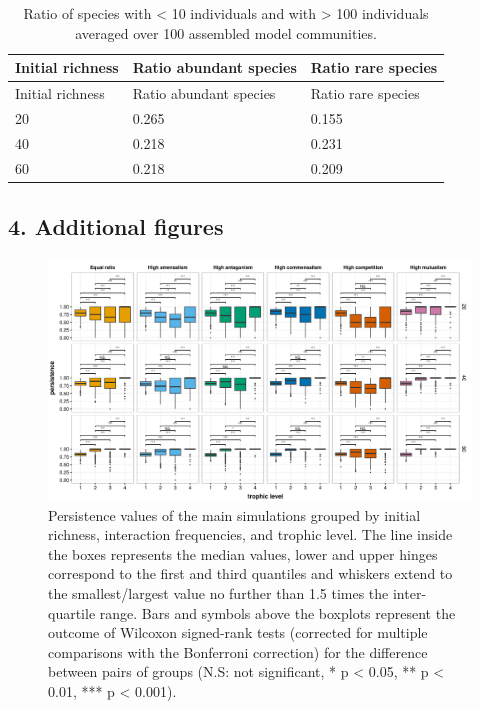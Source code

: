 \begin{longtable}[]{@{}lll@{}}
\caption[Rare and very abundant species]{\color{Gray} Ratio of species with \textless{} 10 individuals and with \textgreater{} 100 individuals averaged over 100 assembled model communities.}\label{tab:tableApp3.2.7}\\
\toprule
Initial richness & Ratio abundant species & Ratio rare species\tabularnewline
\midrule
\endfirsthead
\toprule
Initial richness & Ratio abundant species & Ratio rare species\tabularnewline
\midrule
\endhead

20 & 0.265 & 0.155\tabularnewline
40 & 0.218 & 0.231\tabularnewline
60 & 0.218 & 0.209\tabularnewline
\bottomrule

\end{longtable}

\subsection*{4. Additional figures}

\begin{figure}[!ht]
\centering
\includegraphics[width=\textwidth]{./Figures/Appendix3_2/Fig_1.png}
\caption[Persistence by trophic level]{\color{Gray} Persistence values of the main simulations grouped by initial richness, interaction frequencies, and trophic level. The line inside the boxes represents the median values, lower and upper hinges correspond to the first and third quantiles and whiskers extend to the smallest/largest value no further than 1.5 times the inter-quartile range. Bars and symbols above the boxplots represent the outcome of Wilcoxon signed-rank tests (corrected for multiple comparisons with the Bonferroni correction) for the difference between pairs of groups (N.S: not significant, * p \textless{} 0.05, ** p \textless{} 0.01, *** p \textless{} 0.001).}
\label{fig:figApp3.2.1}
\end{figure}

